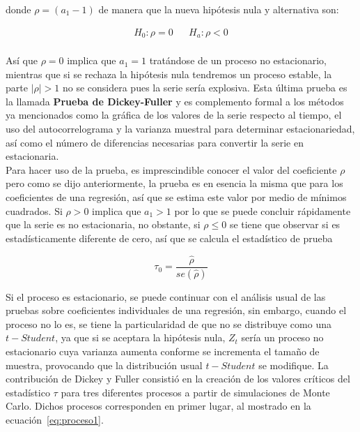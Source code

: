 donde $\rho=(a_1-1)$ de manera que la nueva hipótesis nula y alternativa son:

   \begin{eqnarray}
    H_0: \rho=0 &  &  H_a: \rho  < 0   \\ 
    \nonumber 
   \end{eqnarray} 


 Así que $\rho=0$ implica que $a_1=1$ tratándose de un proceso no estacionario, mientras que si se rechaza la hipótesis nula tendremos un proceso estable, la parte $\left | \rho \right |>1$ no se considera pues la serie sería explosiva. Esta última prueba es la llamada \textbf{Prueba de Dickey-Fuller} y es complemento formal a los m\'etodos ya mencionados como la gráfica de los valores de la serie respecto al tiempo, el uso del autocorrelograma y la varianza muestral para determinar estacionariedad, así como el número de diferencias necesarias para convertir la serie en estacionaria.\\
 
 Para hacer uso de la prueba, es imprescindible conocer el valor del coeficiente $\rho$ pero como se dijo anteriormente, la prueba es en esencia la misma que para los coeficientes de una regresión, así que se estima este valor por medio de mínimos cuadrados. Si $\rho >0$ implica que $a_1>1$ por lo que se puede concluir rápidamente que la serie es no estacionaria, no obstante, si $\rho \leq 0$ se tiene que observar si es estadísticamente diferente de cero, así que se calcula el estadístico de prueba
 
 \begin{equation}
 \tau_0=\frac{\hat{\rho}}{se(\hat{\rho})}
 \end{equation}
 
Si el proceso es estacionario, se puede continuar con el análisis usual de las pruebas sobre coeficientes individuales de una regresión, sin embargo, cuando el proceso no lo es, se tiene la particularidad de que no se distribuye como una $t-Student$, ya que si se aceptara la hipótesis nula, $Z_t$ sería un proceso no estacionario cuya varianza aumenta conforme se incrementa el tamaño de muestra, provocando que la distribución usual $t-Student$ se modifique. La contribución de Dickey y Fuller consistió en la creación de los valores críticos del estadístico $\tau$ para tres diferentes procesos  a partir de simulaciones de Monte Carlo. Dichos procesos corresponden en primer lugar, al mostrado en la ecuación~\ref{eq:proceso1}. \\

